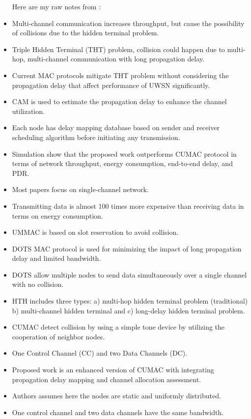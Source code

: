 \documentclass{article}
\begin{document}
\begin{itemize}
Here are my raw notes from  \cite{PurobiRahmanMohammadShahAlamShamimAraShawkat2017}:
  \item Multi-channel communication increases throughput, but cause the possibility of collisions due to the hidden terminal problem.
  \item Triple Hidden Terminal (THT) problem, collision could happen due to multi-hop, multi-channel communication with long propagation delay.
  \item Current MAC protocols mitigate THT problem without considering the propagation delay that affect performance of UWSN significantly. 
  \item CAM is used to estimate the propagation delay to enhance the channel utilization.
  \item Each node has  delay mapping database based on sender and receiver scheduling algorithm before initiating any transmission.
  \item Simulation show that the proposed work outperforms CUMAC protocol in terms of network throughput, energy consumption, end-to-end delay, and PDR.
  \item Most papers focus on single-channel network.
  \item Transmitting data is almost 100 times more expensive than receiving data in terms on energy consumption.
  \item UMMAC is based on slot reservation to avoid collision.
  \item DOTS MAC protocol is used for minimizing the impact of long propagation delay and limited bandwidth. 
  \item DOTS allow multiple nodes to send data simultaneously over a single channel with no collision.
  \item HTH includes three types: a) multi-hop hidden terminal problem (traditional) b) multi-channel hidden terminal and c) long-delay hidden terminal problem.
  \item CUMAC detect collision by using a simple tone device by utilizing the cooperation of neighbor nodes.
  \item One Control Channel (CC) and two Data Channels (DC).
  \item Proposed work is an enhanced version of CUMAC with integrating propagation delay mapping and channel allocation assessment.
  \item Authors assumes here the nodes are static and uniformly distributed.
  \item One control channel and two data channels have the same bandwidth.

\end{itemize}
\end{document}
